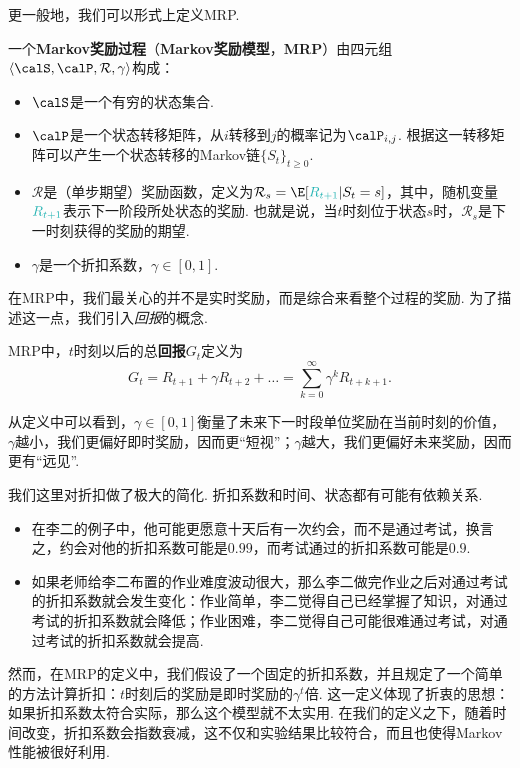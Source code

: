 更一般地，我们可以形式上定义MRP.

\begin{definition}
一个\textbf{Markov奖励过程}（\textbf{Markov奖励模型}，\textbf{MRP}）由四元组$\langle\calS,\calP,\mathcal R,\gamma\rangle$构成：
\begin{itemize}
    \item $\calS$是一个有穷的状态集合.
    \item $\calP$是一个状态转移矩阵，从$i$转移到$j$的概率记为$\calP_{i,j}$. 根据这一转移矩阵可以产生一个状态转移的Markov链$\{S_t\}_{t\geq 0}$.
    \item $\mathcal R$是（单步期望）奖励函数，定义为$\mathcal R_s = \E[\textcolor{TealBlue}{R_{t+1}}|S_t=s]$，其中，随机变量$\textcolor{TealBlue}{R_{t+1}}$表示下一阶段所处状态的奖励. 也就是说，当$t$时刻位于状态$s$时，$\mathcal R_s$是下一时刻获得的奖励的期望.
    \item $\gamma$是一个折扣系数，$\gamma\in[0,1]$.
\end{itemize}
\end{definition}

在MRP中，我们最关心的并不是实时奖励，而是综合来看整个过程的奖励. 为了描述这一点，我们引入\emph{回报}的概念.

\begin{definition}[回报]
MRP中，$t$时刻以后的总\textbf{回报}$G_t$定义为
    \[G_t = R_{t+1}+\gamma R_{t+2} +\dots =\sum_{k=0}^\infty \gamma^kR_{t+k+1}.\]    
\end{definition}
从定义中可以看到，$\gamma \in[0,1]$衡量了未来下一时段单位奖励在当前时刻的价值，$\gamma$越小，我们更偏好即时奖励，因而更“短视”；$\gamma$越大，我们更偏好未来奖励，因而更有“远见”.

我们这里对折扣做了极大的简化. 折扣系数和时间、状态都有可能有依赖关系. 
\begin{itemize}
    \item 在李二的例子中，他可能更愿意十天后有一次约会，而不是通过考试，换言之，约会对他的折扣系数可能是$0.99$，而考试通过的折扣系数可能是$0.9$.
    \item 如果老师给李二布置的作业难度波动很大，那么李二做完作业之后对通过考试的折扣系数就会发生变化：作业简单，李二觉得自己已经掌握了知识，对通过考试的折扣系数就会降低；作业困难，李二觉得自己可能很难通过考试，对通过考试的折扣系数就会提高.
\end{itemize}
然而，在MRP的定义中，我们假设了一个固定的折扣系数，并且规定了一个简单的方法计算折扣：$t$时刻后的奖励是即时奖励的$\gamma^t$倍. 这一定义体现了折衷的思想：如果折扣系数太符合实际，那么这个模型就不太实用. 在我们的定义之下，随着时间改变，折扣系数会指数衰减，这不仅和实验结果比较符合，而且也使得Markov性能被很好利用.

